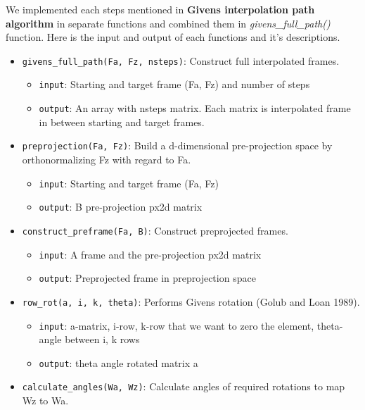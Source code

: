 We implemented each steps mentioned in \textbf{Givens interpolation path algorithm} in separate functions and combined them in \emph{givens\_full\_path()} function. Here is the input and output of each functions and it's descriptions.

\begin{itemize}
\tightlist
\item
  \texttt{givens\_full\_path(Fa,\ Fz,\ nsteps)}: Construct full interpolated frames.

  \begin{itemize}
  \tightlist
  \item
    \texttt{input}: Starting and target frame (Fa, Fz) and number of steps
  \item
    \texttt{output}: An array with nsteps matrix. Each matrix is interpolated frame in between starting and target frames.
  \end{itemize}
\item
  \texttt{preprojection(Fa,\ Fz)}: Build a d-dimensional pre-projection space by orthonormalizing Fz with regard to Fa.

  \begin{itemize}
  \tightlist
  \item
    \texttt{input}: Starting and target frame (Fa, Fz)
  \item
    \texttt{output}: B pre-projection px2d matrix
  \end{itemize}
\item
  \texttt{construct\_preframe(Fa,\ B)}: Construct preprojected frames.

  \begin{itemize}
  \tightlist
  \item
    \texttt{input}: A frame and the pre-projection px2d matrix
  \item
    \texttt{output}: Preprojected frame in preprojection space
  \end{itemize}
\item
  \texttt{row\_rot(a,\ i,\ k,\ theta)}: Performs Givens rotation (Golub and Loan 1989).

  \begin{itemize}
  \tightlist
  \item
    \texttt{input}: a-matrix, i-row, k-row that we want to zero the element, theta-angle between i, k rows
  \item
    \texttt{output}: theta angle rotated matrix a
  \end{itemize}
\item
  \texttt{calculate\_angles(Wa,\ Wz)}: Calculate angles of required rotations to map Wz to Wa.


\end{itemize}
